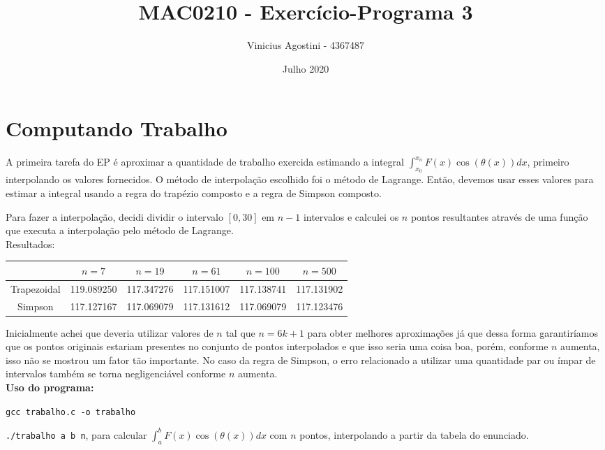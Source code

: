 \documentclass[leqno]{article}
\title{MAC0210 - Exercício-Programa 3}
\author{Vinicius Agostini - 4367487}
\date{Julho 2020}
\begin{document}
\maketitle

\section{Computando Trabalho}
A primeira tarefa do EP é aproximar a quantidade de trabalho exercida estimando
a integral $\int_{x_0}^{x_n}F(x)\cos(\theta(x))dx$, primeiro interpolando os valores
fornecidos. O método de interpolação escolhido foi o método de Lagrange. Então,
devemos usar esses valores para estimar a integral usando a regra do
trapézio composto e a regra de Simpson composto.

Para fazer a interpolação, decidi dividir o intervalo $[0,30]$ em $n-1$ intervalos
e calculei os $n$ pontos resultantes através de uma função que executa a interpolação
pelo método de Lagrange. \\

Resultados:
\begin{table}[H]
    \centering
    \begin{tabular}{c|c|c|c|c|c|}
    \cline{2-6}
                                      & $n = 7$    & $n = 19$   & $n = 61$   & $n = 100$  & $n = 500$  \\ \hline
    \multicolumn{1}{|c|}{Trapezoidal} & 119.089250 & 117.347276 & 117.151007 & 117.138741 & 117.131902 \\ \hline
    \multicolumn{1}{|c|}{Simpson}     & 117.127167 & 117.069079 & 117.131612 & 117.069079 & 117.123476 \\ \hline
    \end{tabular}
    \end{table}

Inicialmente achei que deveria utilizar valores de $n$ tal que $n = 6k + 1$ para
obter melhores aproximações já que dessa forma garantiríamos que os pontos originais
estariam presentes no conjunto de pontos interpolados e que isso seria uma coisa
boa, porém, conforme $n$ aumenta, isso não se mostrou um fator tão importante.
No caso da regra de Simpson, o erro relacionado a utilizar uma quantidade par
ou ímpar de intervalos também se torna negligenciável conforme $n$ aumenta.
\\

\textbf{Uso do programa:}

\texttt{gcc trabalho.c -o trabalho}

\texttt{./trabalho a b n}, para calcular $\int_a^b F(x)\cos(\theta(x))dx$ com
$n$ pontos, interpolando a partir da tabela do enunciado.
\end{document}

